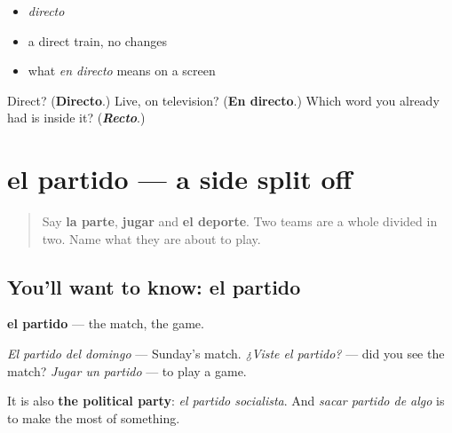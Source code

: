 \begin{itemize}
\raggedright
  \item \emph{directo}
  \item a direct train, no changes
  \item what \emph{en directo} means on a screen
\end{itemize}

\begin{tcolorbox}[breakable,colback=teal!4,colframe=teal!35!black,title={Before you move on}]
Direct? (\textbf{Directo}.) Live, on television? (\textbf{En directo}.) Which word you already had is inside it? (\emph{\textbf{Recto}}.)
\end{tcolorbox}
\section[el partido]{el partido — a side split off}

\label{lesson:ES-C446-partido}



\begin{quote}
Say \textbf{la parte}, \textbf{jugar} and \textbf{el deporte}. Two teams are a whole divided in two. Name what they are about to play.
\end{quote}

\subsection*{You'll want to know: el partido}
\textbf{el partido} — the match, the game.

\emph{El partido del domingo} — Sunday's match. \emph{¿Viste el partido?} — did you see the match? \emph{Jugar un partido} — to play a game.

It is also \textbf{the political party}: \emph{el partido socialista}. And \emph{sacar partido de algo} is to make the most of something.

